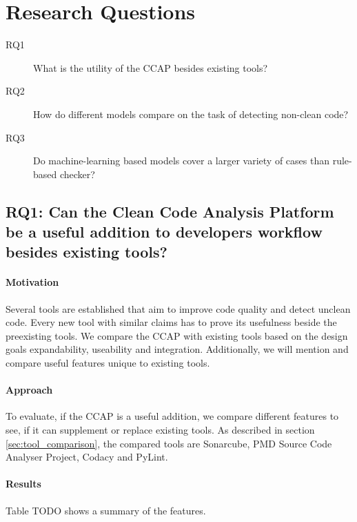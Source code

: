 \section{Research Questions}

\begin{description}
    \item[RQ1] What is the utility of the CCAP besides existing tools? 
    \item[RQ2] How do different models compare on the task of detecting non-clean code?
    \item[RQ3] Do machine-learning based models cover a larger variety of cases than rule-based checker? 
\end{description}

\subsection{RQ1: Can the Clean Code Analysis Platform be a useful addition to developers workflow besides existing tools?}
\paragraph{Motivation}
Several tools are established that aim to improve code quality and detect unclean code. Every new tool with similar claims has to prove its usefulness beside the preexisting tools. We compare the CCAP with existing tools based on the design goals expandability, useability and integration. Additionally, we will mention and compare useful features unique to existing tools.
\paragraph{Approach}
To evaluate, if the CCAP is a useful addition, we compare different features to see, if it can supplement or replace existing tools. As described in section \ref{sec:tool_comparison}, the compared tools are Sonarcube, PMD Source Code Analyser Project, Codacy and PyLint.

\paragraph{Results}
Table TODO shows a summary of the features.

